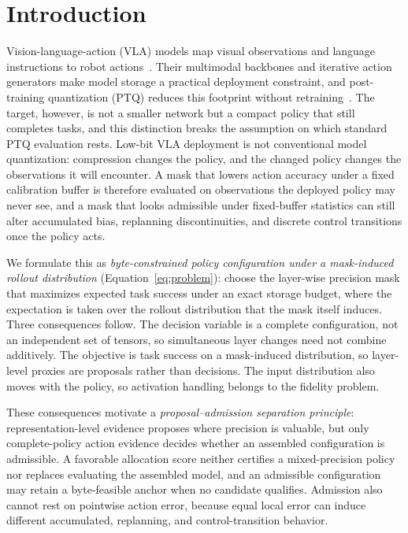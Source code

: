 \section{Introduction}
\label{sec:introduction}

Vision-language-action (VLA) models map visual observations and language instructions to robot actions~\citep{brohan2023rt2,octo2024,kim2024openvla,black2024pi0,intelligence2025pi05,bjorck2025groot}. Their multimodal backbones and iterative action generators make model storage a practical deployment constraint, and post-training quantization (PTQ) reduces this footprint without retraining~\citep{xiao2023smoothquant,lin2024duquant}. The target, however, is not a smaller network but a compact policy that still completes tasks, and this distinction breaks the assumption on which standard PTQ evaluation rests. Low-bit VLA deployment is not conventional model quantization: compression changes the policy, and the changed policy changes the observations it will encounter. A mask that lowers action accuracy under a fixed calibration buffer is therefore evaluated on observations the deployed policy may never see, and a mask that looks admissible under fixed-buffer statistics can still alter accumulated bias, replanning discontinuities, and discrete control transitions once the policy acts.

We formulate this as \emph{byte-constrained policy configuration under a mask-induced rollout distribution} (Equation~\ref{eq:problem}): choose the layer-wise precision mask that maximizes expected task success under an exact storage budget, where the expectation is taken over the rollout distribution that the mask itself induces. Three consequences follow. The decision variable is a complete configuration, not an independent set of tensors, so simultaneous layer changes need not combine additively. The objective is task success on a mask-induced distribution, so layer-level proxies are proposals rather than decisions. The input distribution also moves with the policy, so activation handling belongs to the fidelity problem.

These consequences motivate a \emph{proposal--admission separation principle}: representation-level evidence proposes where precision is valuable, but only complete-policy action evidence decides whether an assembled configuration is admissible. A favorable allocation score neither certifies a mixed-precision policy nor replaces evaluating the assembled model, and an admissible configuration may retain a byte-feasible anchor when no candidate qualifies. Admission also cannot rest on pointwise action error, because equal local error can induce different accumulated, replanning, and control-transition behavior.

